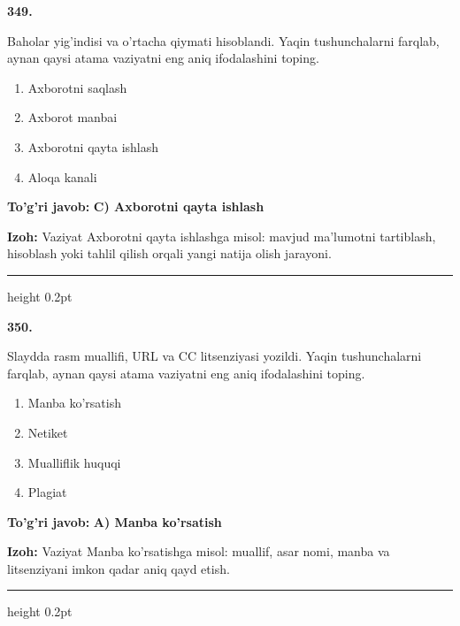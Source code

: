 \documentclass[10pt,a4paper,oneside]{article}
\begin{document}
\noindent\textbf{\color{ink}349.}
\par
Baholar yig'indisi va o'rtacha qiymati hisoblandi. Yaqin tushunchalarni farqlab, aynan qaysi atama vaziyatni eng aniq ifodalashini toping.
\begin{enumerate}[label=\Alph*),leftmargin=9mm]
\item Axborotni saqlash
\item Axborot manbai
\item Axborotni qayta ishlash
\item Aloqa kanali
\end{enumerate}
\begin{tcolorbox}[enhanced,breakable,colback=teal!4,colframe=teal!50!black,boxrule=0.5pt,arc=1.1mm,left=3mm,right=3mm,top=1.7mm,bottom=1.7mm,before skip=2mm,after skip=2mm]
\textbf{\color{teal}To'g'ri javob:} \textbf{C) Axborotni qayta ishlash}
\par\smallskip
\textbf{Izoh:} Vaziyat Axborotni qayta ishlashga misol: mavjud ma'lumotni tartiblash, hisoblash yoki tahlil qilish orqali yangi natija olish jarayoni.
\end{tcolorbox}
\vspace{2mm}\hrule height 0.2pt \vspace{3mm}

\noindent\textbf{\color{ink}350.}
\par
Slaydda rasm muallifi, URL va CC litsenziyasi yozildi. Yaqin tushunchalarni farqlab, aynan qaysi atama vaziyatni eng aniq ifodalashini toping.
\begin{enumerate}[label=\Alph*),leftmargin=9mm]
\item Manba ko'rsatish
\item Netiket
\item Mualliflik huquqi
\item Plagiat
\end{enumerate}
\begin{tcolorbox}[enhanced,breakable,colback=teal!4,colframe=teal!50!black,boxrule=0.5pt,arc=1.1mm,left=3mm,right=3mm,top=1.7mm,bottom=1.7mm,before skip=2mm,after skip=2mm]
\textbf{\color{teal}To'g'ri javob:} \textbf{A) Manba ko'rsatish}
\par\smallskip
\textbf{Izoh:} Vaziyat Manba ko'rsatishga misol: muallif, asar nomi, manba va litsenziyani imkon qadar aniq qayd etish.
\end{tcolorbox}
\vspace{2mm}\hrule height 0.2pt \vspace{3mm}
\end{document}
